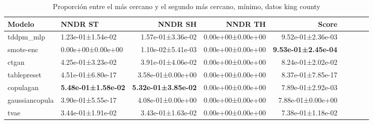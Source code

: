\begin{table}[H]
\centering
\fontsize{10}{14}\selectfont
\caption{Proporción entre el más cercano y el segundo más cercano, mínimo, datos king county}
\label{table-dcr-king county-a}
\begin{tabular}{|l|l|r|r|r|r|r|r|r|}
\hline
\rowcolor[gray]{0.8}
Modelo & NNDR ST & NNDR SH & NNDR TH & \textbf{Score} \\
\hline tddpm\_mlp & 1.23e-01±1.54e-02 & 1.57e-01±3.36e-02 & 0.00e+00±0.00e+00 & 9.52e-01±2.36e-03 \\
\hline smote-enc & \cellcolor[rgb]{0.9, 0.54, 0.52} 0.00e+00±0.00e+00 & \cellcolor[rgb]{0.9, 0.54, 0.52} 1.10e-02±5.41e-03 & 0.00e+00±0.00e+00 & \bfseries 9.53e-01±2.45e-04 \\
\hline ctgan & 4.25e-01±3.23e-02 & 3.91e-01±4.06e-02 & 0.00e+00±0.00e+00 & 8.24e-01±2.02e-02 \\
\hline tablepreset & 4.51e-01±6.80e-17 & 3.58e-01±0.00e+00 & 0.00e+00±0.00e+00 & 8.37e-01±7.85e-17 \\
\hline copulagan & \bfseries 5.48e-01±1.58e-02 & \bfseries 5.32e-01±3.85e-02 & 0.00e+00±0.00e+00 & 7.89e-01±2.92e-03 \\
\hline gaussiancopula & 3.90e-01±5.55e-17 & 4.08e-01±0.00e+00 & 0.00e+00±0.00e+00 & 7.88e-01±0.00e+00 \\
\hline tvae & 3.44e-01±1.91e-02 & 3.43e-01±1.63e-02 & 0.00e+00±0.00e+00 & \cellcolor[rgb]{0.9, 0.54, 0.52} 7.38e-01±1.18e-02 \\
\hline
\end{tabular}
\end{table}
